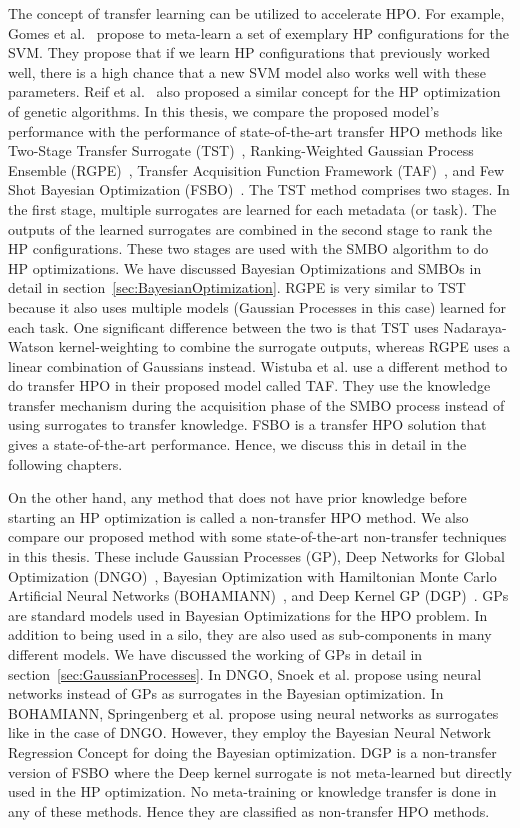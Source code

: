 \documentclass[12pt, twoside, ngerman]{report}
\begin{document}
The concept of transfer learning can be utilized to accelerate HPO.
For example,  Gomes et al.~\cite{svmhpmetalearnt} propose to meta-learn a set of exemplary HP configurations for the SVM.
They propose that if we learn HP configurations that previously worked well, there is a high chance that a new SVM model also works well with these parameters.
Reif et al.~\cite{metalearningwarmstartpaper} also proposed a similar concept for the HP optimization of genetic algorithms.
In this thesis, we compare the proposed model's performance with the performance of state-of-the-art transfer HPO methods like Two-Stage Transfer Surrogate (TST)~\cite{tstpaper}, Ranking-Weighted Gaussian Process Ensemble (RGPE)~\cite{Feurer2018ScalableMF}, Transfer Acquisition Function Framework (TAF)~\cite{Wistuba2017ScalableGP}, and Few Shot Bayesian Optimization (FSBO)~\cite{fsbopaper}.
The TST method comprises two stages. In the first stage, multiple surrogates are learned for each metadata (or task). The outputs of the learned surrogates are combined in the second stage to rank the HP configurations. These two stages are used with the SMBO algorithm to do HP optimizations. We have discussed Bayesian Optimizations and SMBOs in detail in section~\ref{sec:BayesianOptimization}.
RGPE is very similar to TST because it also uses multiple models (Gaussian Processes in this case) learned for each task. One significant difference  between the two is that TST uses Nadaraya-Watson kernel-weighting to combine the surrogate outputs, whereas RGPE uses a linear combination of Gaussians instead. Wistuba et al. use a different method to do transfer HPO in their proposed model called TAF. They use the knowledge transfer mechanism during the acquisition phase of the SMBO process instead of using surrogates to transfer knowledge.
FSBO is a transfer HPO solution that gives a state-of-the-art performance.  Hence, we discuss this in detail in the following chapters.

On the other hand, any method that does not have prior knowledge before starting an HP optimization is called a non-transfer HPO method.
We also compare our proposed method with some state-of-the-art non-transfer techniques in this thesis. These include Gaussian Processes (GP), Deep Networks for Global Optimization (DNGO)~\cite{dngopaper}, Bayesian Optimization with Hamiltonian Monte Carlo Artificial Neural Networks (BOHAMIANN)~\cite{bohamiannpaper}, and Deep Kernel GP (DGP)~\cite{fsbopaper}. GPs are standard models used in Bayesian Optimizations for the HPO problem. In addition to being used in a silo, they are also used as sub-components in many different models. We have discussed the working of GPs in detail in section~\ref{sec:GaussianProcesses}. In DNGO, Snoek et al. propose using neural networks instead of GPs as surrogates in the Bayesian optimization. In BOHAMIANN, Springenberg et al. propose using neural networks as surrogates like in the case of DNGO. However, they employ the Bayesian Neural Network Regression Concept for doing the Bayesian optimization.
DGP is a non-transfer version of FSBO where the Deep kernel surrogate is not meta-learned but directly used in the HP optimization.
No meta-training or knowledge transfer is done in any of these methods. Hence they are classified as non-transfer HPO methods.
\end{document}
